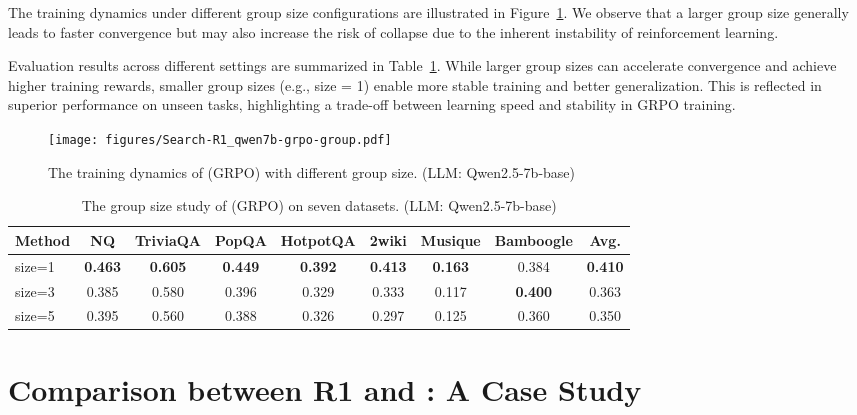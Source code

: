 The training dynamics under different group size configurations are illustrated in Figure~\ref{fig:apx:grpo-num}. We observe that a larger group size generally leads to faster convergence but may also increase the risk of collapse due to the inherent instability of reinforcement learning.

Evaluation results across different settings are summarized in Table~\ref{tab:apx:grpo-size}. While larger group sizes can accelerate convergence and achieve higher training rewards, smaller group sizes (e.g., size = 1) enable more stable training and better generalization. This is reflected in superior performance on unseen tasks, highlighting a trade-off between learning speed and stability in GRPO training.

\begin{figure}[h]
    \centering
    \texttt{[image: figures/Search-R1\_qwen7b-grpo-group.pdf]}
    \caption{The training dynamics of \Ours (GRPO) with different group size. (LLM: Qwen2.5-7b-base)}
    \label{fig:apx:grpo-num}
\end{figure}

\begin{table}[h]
    \centering
    \scriptsize
    \setlength{\tabcolsep}{3pt}
    
    \caption{The group size study of \Ours (GRPO) on seven datasets. (LLM: Qwen2.5-7b-base)}\label{tab:apx:grpo-size}
    \begin{tabular}{lcccccccc}
        \toprule
        \textbf{Method} & \textbf{NQ} & \textbf{TriviaQA} & \textbf{PopQA} & \textbf{HotpotQA} & \textbf{2wiki} & \textbf{Musique} & \textbf{Bamboogle} & \textbf{Avg.} \\
        \midrule
        
        size=1 & \textbf{0.463} & \textbf{0.605} & \textbf{0.449} & \textbf{0.392} & \textbf{0.413} & \textbf{0.163} & 0.384 & \textbf{0.410} \\
        size=3 & 0.385 & 0.580 & 0.396 & 0.329 & 0.333 & 0.117 & \textbf{0.400} & 0.363 \\
        size=5 & 0.395 & 0.560 & 0.388 & 0.326 & 0.297 & 0.125 & 0.360 & 0.350 \\
        \bottomrule
    \end{tabular}
\end{table}

\newpage
\section{Comparison between R1 and \Ours: A Case Study}\label{apx:sec:case1}

